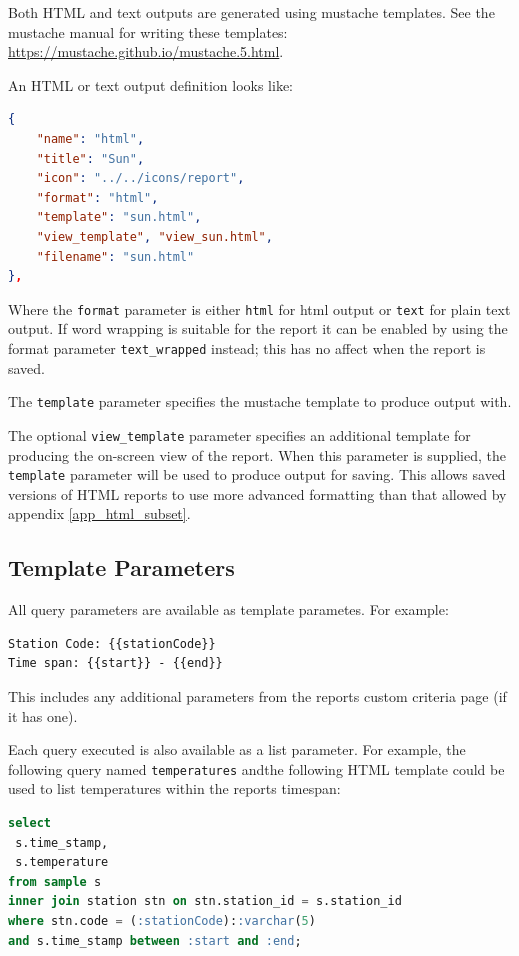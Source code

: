 \documentclass[a4paper,10pt]{book}
\begin{document}
Both HTML and text outputs are generated using mustache templates. See the mustache manual for writing these templates: \url{https://mustache.github.io/mustache.5.html}. 

An HTML or text output definition looks like:
\begin{lstlisting}[language=json]
 {
	"name": "html",
	"title": "Sun",
	"icon": "../../icons/report",
	"format": "html",
	"template": "sun.html",
	"view_template", "view_sun.html",
	"filename": "sun.html"
},
\end{lstlisting}

Where the \verb|format| parameter is either \verb|html| for html output or \verb|text| for plain text output. If word wrapping is suitable for the report it can be enabled by using the format parameter \verb|text_wrapped| instead; this has no affect when the report is saved.

The \verb|template| parameter specifies the mustache template to produce output with. 

The optional \verb|view_template| parameter specifies an additional template for producing the on-screen view of the report. When this parameter is supplied, the \verb|template| parameter will be used to produce output for saving. This allows saved versions of HTML reports to use more advanced formatting than that allowed by appendix \ref{app_html_subset}.

\subsection{Template Parameters}
All query parameters are available as template parametes. For example:
\begin{verbatim}
Station Code: {{stationCode}}
Time span: {{start}} - {{end}}
\end{verbatim}

This includes any additional parameters from the reports custom criteria page (if it has one).

Each query executed is also available as a list parameter. For example, the following query named \verb|temperatures| andthe following HTML template could be used to list temperatures within the reports timespan:
\begin{lstlisting}[language=SQL]
select
 s.time_stamp,
 s.temperature
from sample s
inner join station stn on stn.station_id = s.station_id
where stn.code = (:stationCode)::varchar(5)
and s.time_stamp between :start and :end;
\end{lstlisting}
\end{document}

